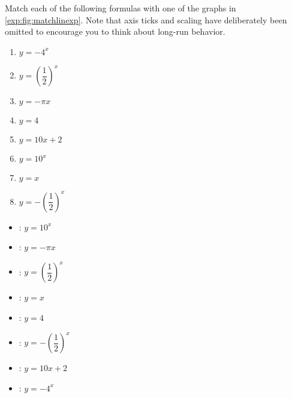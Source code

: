 \begin{exercises}
\FloatBarrier
\begin{problem}
Match each of the following formulas with one of the graphs in 
\cref{exp:fig:matchlinexp}. Note that axis ticks and scaling have deliberately
been omitted to encourage you to think about long-run behavior. 
\begin{multicols}{4}
	\begin{enumerate}[label=(\roman*)]
		\item $y=-4^x$
		\item $y=\left( \dfrac{1}{2} \right)^x$
		\item $y=-\pi x$
		\item $y=4$
		\item $y=10x+2$
		\item $y=10^x$
		\item $y=x$
		\item $y=-\left( \dfrac{1}{2} \right)^x$
	\end{enumerate}
\end{multicols}
\begin{shortsolution}
	\begin{itemize}
		\item {}: $y=10^x$
		\item {}: $y=-\pi x$
		\item {}: $y=\left( \dfrac{1}{2} \right)^x$
		\item {}: $y=x$
		\item {}: $y=4$
		\item {}: $y=-\left( \dfrac{1}{2} \right)^x$
		\item {}: $y=10x+2$
		\item {}: $y=-4^x$
	\end{itemize}
\end{shortsolution}
\end{problem}
			

\end{exercises}
